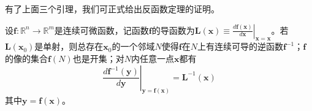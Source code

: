 \documentclass[main.tex]{subfiles}
\begin{document}
有了上面三个引理，我们可正式给出反函数定理的证明。
\begin{theorem}[反函数定理]
设$\mathbf{f}:\mathbb{R}^n\rightarrow\mathbb{R}^m$是连续可微函数，记函数$\mathbf{f}$的导函数为$\mathbf{L}\left(\mathbf{x}\right)\equiv\left.\frac{d\mathbf{f}\left(\mathbf{x}\right)}{d\mathbf{x}}\right|_{\mathbf{x}=\mathbf{x}}$。若$\mathbf{L}\left(\mathbf{x}_0\right)$是单射，则总存在$\mathbf{x}_0$的一个邻域$N$使得$\mathbf{f}$在$N$上有连续可导的逆函数$\mathbf{f}^{-1}$；$\mathbf{f}$的像的集合$\mathbf{f}\left(N\right)$也是开集；对$N$内任意一点$\mathbf{x}$都有
\[
\left.\frac{d\mathbf{f}^{-1}\left(\mathbf{y}\right)}{d\mathbf{y}}\right|_{\mathbf{y}=\mathbf{f}\left(\mathbf{x}\right)}=\mathbf{L}^{-1}\left(\mathbf{x}\right)
\]
其中$\mathbf{y}=\mathbf{f}\left(\mathbf{x}\right)$。
\end{theorem}
\end{document}

